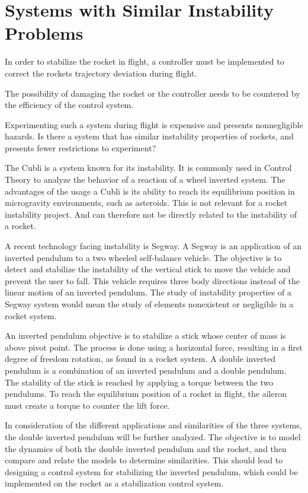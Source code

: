 \section{Systems with Similar Instability Problems}
\graphicspath{{figures/"Preanalysis&Requirement"/SimilarSystems/}}

In order to stabilize the rocket in flight, a controller must be implemented to correct the rockets trajectory deviation during flight.

The possibility of damaging the rocket or the controller needs to be countered by the efficiency of the control system.


Experimenting such a system during flight is expensive and presents nonnegligible hazards.
Is there a system that has similar instability properties of rockets, and presents fewer restrictions to experiment?

The Cubli is a system known for its instability. It is commonly used in Control Theory to analyze the behavior of a reaction of a wheel inverted system. The advantages of the usage a Cubli is its ability to reach its equilibrium position in microgravity environments, such as asteroids. This is not relevant for a rocket instability project. And can therefore not be directly related to the instability of a rocket.

A recent technology facing instability is Segway. A Segway is an application of an inverted pendulum to a two wheeled self-balance vehicle. The objective is to detect and stabilize the instability of the vertical stick to move the vehicle and prevent the user to fall. This vehicle requires three body directions instead of the linear motion of an inverted pendulum. The study of instability properties of a Segway system would mean the study of elements nonexistent or negligible in a rocket system.

An inverted pendulum objective is to stabilize a stick whose center of mass is above pivot point. The process is done using a horizontal force, resulting in a first degree of freedom rotation, as found in a rocket system. A double inverted pendulum is a combination of an inverted pendulum and a double pendulum. The stability of the stick is reached by applying a torque between the two pendulums. To reach the equilibrium position of a rocket in flight, the aileron must create a torque to counter the lift force.

In consideration of the different applications and similarities of the three systems, the double inverted pendulum will be further analyzed. The objective is to model the dynamics of both the double inverted pendulum and the rocket, and then compare and relate the models to determine similarities. This should lead to designing a control system for stabilizing the inverted pendulum, which could be implemented on the rocket as a stabilization control system. 




